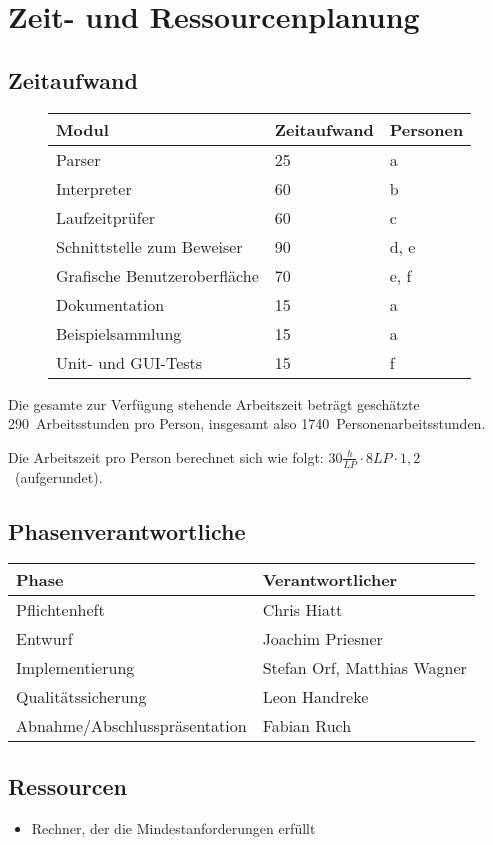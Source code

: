 \section{Zeit- und Ressourcenplanung}%

\subsection{Zeitaufwand}%

\begin{figure}[H]
  \begin{tabular}{| l | l | l | }
    \hline
    \textbf{Modul} & \textbf{Zeitaufwand} & \textbf{Personen} \\ \hline
    Parser & 25 & a \\ \hline
    Interpreter & 60 & b \\ \hline
    Laufzeitprüfer & 60 & c \\ \hline
    Schnittstelle zum Beweiser & 90 & d, e \\ \hline
    Grafische Benutzeroberfläche & 70 & e, f \\ \hline
    Dokumentation & 15 & a \\ \hline
    Beispielsammlung & 15 & a \\ \hline
    Unit- und GUI-Tests & 15 & f \\ \hline
  \end{tabular}
\end{figure}

Die gesamte zur Verfügung stehende Arbeitszeit beträgt geschätzte 290~Arbeitsstunden pro Person, insgesamt also 1740~Personenarbeitsstunden.

Die Arbeitszeit pro Person berechnet sich wie folgt: $30\frac{h}{LP} \cdot 8LP \cdot 1,2$~(aufgerundet).

\subsection{Phasenverantwortliche}%

\begin{tabular}{| l | l | }
    \hline
    \textbf{Phase} & \textbf{Verantwortlicher} \\ \hline
    Pflichtenheft & Chris Hiatt \\ \hline
    Entwurf & Joachim Priesner \\ \hline
    Implementierung & Stefan Orf, Matthias Wagner \\ \hline
    Qualitätssicherung & Leon Handreke \\ \hline
    Abnahme/Abschlusspräsentation & Fabian Ruch \\ \hline
\end{tabular}

\subsection{Ressourcen}%

\begin{itemize}%
    \item Rechner, der die Mindestanforderungen erfüllt
\end{itemize}%
